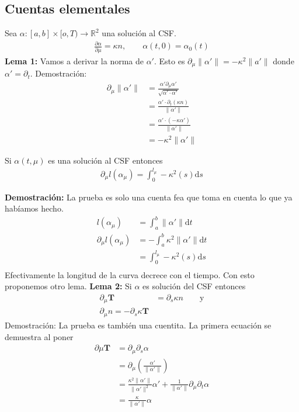 \documentclass{article}
\theoremstyle{mytheoremstyle}
\theoremstyle{mytheoremstyle}
\theoremstyle{myproblemstyle}
\begin{document}
\subsection{Cuentas elementales}
Sea $\alpha: [a,b]\times [o,T)\to \mathbb{R}^2$ una solución al CSF.
\begin{align}
  \frac{\partial\alpha}{\partial \mu }=\kappa n , \qquad \alpha(t,0)=\alpha_0(t)
\end{align}
\textbf{Lema 1:} Vamos a derivar la norma de $\alpha'$. Esto es $\partial_\mu \|\alpha' \|= -\kappa^2 \|a'\|$ donde $\alpha'=\partial_t$. Demostración:
\begin{align}
  \partial_\mu \|\alpha'\|&=\frac{\alpha' \partial_\mu \alpha'}{\sqrt{\alpha'\cdot\alpha'}} \\
                          &= \frac{\alpha' \cdot \partial_t (\kappa n )}{\|\alpha'\|}\\
                          &= \frac{\alpha' \cdot (-\kappa \alpha')}{\|\alpha'\|}\\
                          &= -\kappa^2 \|\alpha'\|
\end{align}
\begin{theorem}[]
  Si $\alpha(t,\mu)$ es una solución al CSF entonces 
  \begin{align}
    \partial _\mu l(\alpha_\mu)= \int_{0}^{l_\mu}-\kappa^2 (s) \mathrm{d} s
  \end{align}
\end{theorem}
\textbf{Demostración:} La prueba es solo una cuenta fea que toma en cuenta lo que ya habíamos hecho.
\begin{align}
  l(\alpha_\mu)&=\int_{a}^{b}\|\alpha'\|\mathrm{d} t \\
  \partial_\mu l(\alpha_\mu) &=-\int_{a}^{b} \kappa^2 \|\alpha'\| \mathrm{d}t \\
             &= \int_{0}^{l_\mu} -\kappa ^2(s)\mathrm{d} s \\ 
\end{align}
Efectivamente la longitud de la curva decrece con el tiempo. Con esto proponemos otro lema.
\textbf{Lema 2:} Si $\alpha$ es solución del CSF entonces 
\begin{align}
  \partial_\mu \bm{T}&=\partial_s \kappa n \qquad \text{y} \\
  \partial_\mu n = -\partial_s \kappa \bm{T}
\end{align}
Demostración: La prueba es también una cuentita.
La primera ecuación se demuestra al poner 
\begin{align}
  \partial\mu \bm{T}&= \partial_\mu\partial_s \alpha \\
                    &= \partial_\mu (\frac{\alpha'}{\|\alpha'\|})\\ 
                    &= \frac{\kappa^2\|\alpha'\|}{\|\alpha'\|^2 }\alpha' + \frac{1}{\|\alpha'\|}\partial_\mu \partial_t\alpha\\ 
                    &= \frac{\kappa}{\|\alpha'\|}\alpha  \\ 
\end{align}
\end{document}
